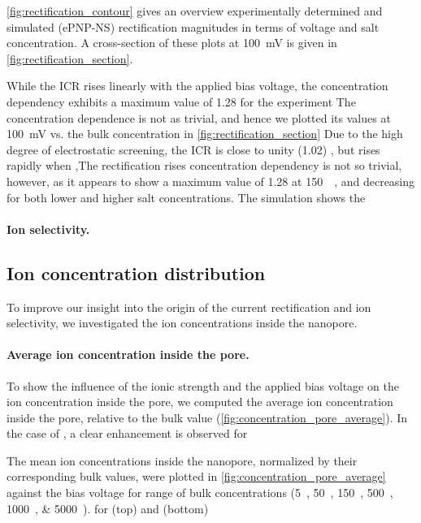 \documentclass[journal=ancac3, manuscript=article, etalmode=truncate,maxauthors=0]{achemso}
\begin{document}
\cref{fig:rectification_contour} gives an overview experimentally determined and simulated (ePNP-NS) rectification magnitudes in terms of voltage and salt concentration.
A cross-section of these plots at \SI{100}{\milli\volt} is given in \cref{fig:rectification_section}.
 

While the ICR rises linearly with the applied bias voltage, the concentration dependency exhibits a maximum value of 1.28 for the experiment
The concentration dependence is not as trivial, and hence we plotted its values at \SI{100}{\milli\volt} vs. the bulk concentration in \cref{fig:rectification_section}
Due to the high degree of electrostatic screening, the ICR is close to unity (1.02) , but rises rapidly when ,The rectification rises concentration dependency is not so trivial, however, as it appears to show a maximum value of 1.28 at \SI{150}{\milli\Molar},
and decreasing for both lower and higher salt concentrations.
The simulation shows the 



\paragraph{Ion selectivity.}


\subsection{Ion concentration distribution}
To improve our insight into the origin of the current rectification and ion selectivity, we investigated the ion concentrations inside the nanopore.

\paragraph{Average ion concentration inside the pore.}
To show the influence of the ionic strength and the applied bias voltage on the ion concentration inside the pore,
we computed the average ion concentration inside the pore, relative to the bulk value (\cref{fig:concentration_pore_average}).
In the case of , a clear enhancement is observed for 

The mean ion concentrations inside the nanopore, normalized by their corresponding bulk values, were plotted in \cref{fig:concentration_pore_average} against the bias voltage for range of bulk concentrations (\SIlist{5;50;150;500;1000;5000}{\mM}).
for  (top) and  (bottom)
\end{document}
